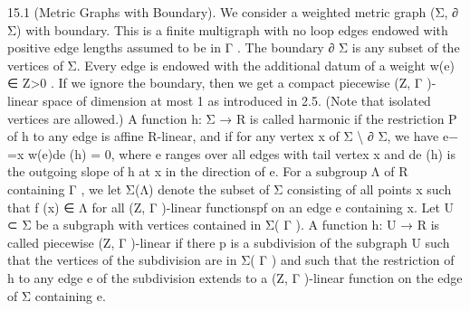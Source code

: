 \documentclass[
  10pt,
]{article}
\newenvironment{Shaded}{}{}
\newcommand{\NormalTok}[1]{#1}
\begin{document}
\begin{Shaded}
\begin{Highlighting}[]
\NormalTok{15.1 (Metric Graphs with Boundary). We consider a weighted metric graph (Σ, ∂ Σ) with}
\NormalTok{boundary. This is a finite multigraph with no loop edges endowed with positive edge}
\NormalTok{lengths assumed to be in Γ . The boundary ∂ Σ is any subset of the vertices of Σ. Every}
\NormalTok{edge is endowed with the additional datum of a weight w(e) ∈ Z\textgreater{}0 . If we ignore the}
\NormalTok{boundary, then we get a compact piecewise (Z, Γ ){-}linear space of dimension at most 1 as}
\NormalTok{introduced in 2.5. (Note that isolated vertices are allowed.)}
\NormalTok{   A function h: Σ → R is called harmonic if the restriction}
\NormalTok{                                                        P         of h to any edge is affine}
\NormalTok{R{-}linear, and if for any vertex x of Σ \textbackslash{} ∂ Σ, we have e− =x w(e)de (h) = 0, where e ranges}
\NormalTok{over all edges with tail vertex x and de (h) is the outgoing slope of h at x in the direction}
\NormalTok{of e.}
\NormalTok{   For a subgroup Λ of R containing Γ , we let Σ(Λ) denote the subset of Σ consisting of}
\NormalTok{all points x such that f (x) ∈ Λ for all (Z, Γ ){-}linear functionspf on an edge e containing}
\NormalTok{x. Let U ⊂ Σ be a subgraph with vertices contained in Σ( Γ ). A function h: U → R}
\NormalTok{is called piecewise (Z, Γ ){-}linear if there}
\NormalTok{                                        p is a subdivision of the subgraph U such that the}
\NormalTok{vertices of the subdivision are in Σ( Γ ) and such that the restriction of h to any edge e}
\NormalTok{of the subdivision extends to a (Z, Γ ){-}linear function on the edge of Σ containing e.}


\end{Highlighting}
\end{Shaded}
\end{document}
